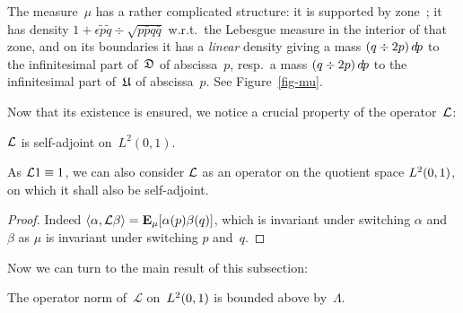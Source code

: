 \begin{Rmk}\label{rmk5379}
The measure~$\mu$ has a rather complicated structure:
it is supported by zone~\twocirc; it has density
$1+\epsilon\tilde{p}\tilde{q} \div \sqrt{p\bar{p}q\bar{q}}$ w.r.t.\ the Lebesgue measure
in the interior of that zone,
and on its boundaries it has a \emph{linear} density giving a mass $(q\div 2p)\,\dx{p}$
to the infinitesimal part of~$\mathfrak{D}$ of abscissa~$p$,
resp.\ a mass $(\bar{q}\div 2\bar{p})\,\dx{p}$ to the infinitesimal part of~$\mathfrak{U}$ of abscissa~$p$.
See Figure~\ref{fig-mu}.
\end{Rmk}

Now that its existence is ensured, we notice a crucial property of the operator~$\mathcal{L}$:
%
\begin{Pro}\label{pro1288}
$\mathcal{L}$ is self-adjoint on~$L^2(0,1)$.
\end{Pro}
%
\begin{Rmk}
As $\mathcal{L}1 \equiv 1$, we can also consider $\mathcal{L}$
as an operator on the quotient space $\ldb(0,1)$,
on which it shall also be self-adjoint.
\end{Rmk}
%
\begingroup{}\begin{proof}
Indeed $\langle \alpha , \mathcal{L}\beta \rangle = \mathop{\smash{\mathbf{E}}}\nolimits_{\mu}[\alpha(p)\beta(q)]$,
which is invariant under switching $\alpha$ and~$\beta$
as $\mu$ is invariant under switching $p$ and~$q$.
\end{proof}\endgroup

Now we can turn to the main result of this subsection:
%
\begin{Lem}\label{lem7792}
The operator norm of~$\mathcal{L}$ on~$\ldb(0,1)$ is bounded above by~$\Lambda$.
\end{Lem}

